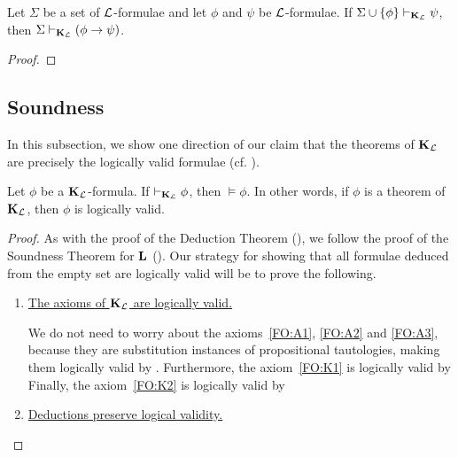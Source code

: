\begin{boxtheorem}\label{Ch2:Thm:Deduction}
    Let $\Sigma$ be a set of $\mathcal{L}$-formulae and let $\phi$ and $\psi$ be $\mathcal{L}$-formulae. If $\Sigma \cup \left\{ \phi \right\} \vdash_{\mathbf{K}_{\mathcal{L}}} \psi$, then $\Sigma \vdash_{\mathbf{K}_{\mathcal{L}}} \left( \phi \to \psi \right)$.
\end{boxtheorem}
\begin{proof}
    \sorry %
\end{proof}



\subsection{Soundness}

In this subsection, we show one direction of our claim that the theorems of $\mathbf{K}_{\mathcal{L}}$ are precisely the logically valid formulae (cf. ).

\begin{boxtheorem}\label{Ch2:Thm:KLSoundness}
    Let $\phi$ be a $\mathbf{K}_{\mathcal{L}}$-formula. If $\vdash_{\mathbf{K}_{\mathcal{L}}} \phi$, then $\models \phi$. In other words, if $\phi$ is a theorem of $\mathbf{K}_{\mathcal{L}}$, then $\phi$ is logically valid.
\end{boxtheorem}
\begin{proof}
    As with the proof of the Deduction Theorem (), we follow the proof of the Soundness Theorem for $\mathbf{L}$ (). Our strategy for showing that all formulae deduced from the empty set are logically valid will be to prove the following.
    \begin{enumerate}
        \item \underline{The axioms of $\mathbf{K}_{\mathcal{L}}$ are logically valid.}

        We do not need to worry about the axioms~\ref{FO:A1}, \ref{FO:A2} and \ref{FO:A3}, because they are substitution instances of propositional tautologies, making them logically valid by . Furthermore, the axiom~\ref{FO:K1} is logically valid by \sorry %
        Finally, the axiom~\ref{FO:K2} is logically valid by \sorry %

        \item \underline{Deductions preserve logical validity.}

        \sorry %
    \end{enumerate}
\end{proof}

